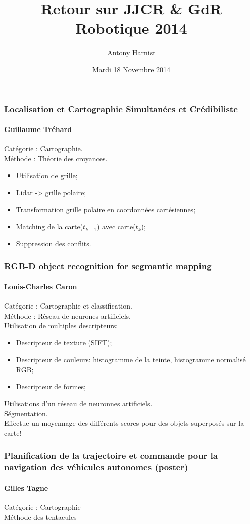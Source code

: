 \documentclass[xcolor=dvipsnames, 12, c, usepdftitle=false]{beamer}
\title[JJCR \& GDR Robotique '14]{Retour sur JJCR \& GdR Robotique 2014}
\author[A. Harnist]{Antony Harnist}
\institute[GIPSA-lab]{Grenoble Images Parole Signal Automatique}
\date[18/11/2014]{Mardi 18 Novembre 2014}
\begin{document}
\begin{frame}
\maketitle			%
\end{frame}

\begin{frame}[c, label=G. Trehard]
  \frametitle{Localisation et Cartographie Simultanées et Crédibiliste}
  \framesubtitle{Guillaume Tréhard}
  Catégorie : Cartographie. \\
  Méthode : Théorie des croyances.\\

  \begin{itemize}
    \item Utilisation de grille;
    \item Lidar -> grille polaire;
    \item Transformation grille polaire en coordonnées cartésiennes;
    \item Matching de la carte($t_{k-1}$) avec carte($t_{k}$);
    \item Suppression des conflits.
  \end{itemize}
\end{frame}
 
\begin{frame}[c, label=LC. Caron]
  \frametitle{RGB-D object recognition for segmantic mapping}
  \framesubtitle{Louis-Charles Caron}
  Catégorie : Cartographie et classification.\\
  Méthode : Réseau de neurones artificiels.\\
  Utilisation de multiples descripteurs:
      \begin{itemize}
	  \item Descripteur de texture (SIFT);
	  \item Descripteur de couleurs: histogramme de la teinte, histogramme normalisé RGB; 
	  \item Descripteur de formes;
      \end{itemize}
  Utilisations d'un réseau de neuronnes artificiels.\\
  Ségmentation.\\
  Effectue un moyennage des différents scores pour des objets superposés sur la carte!
\end{frame}


\begin{frame}[c, label=G. Tagne]
  \frametitle{Planification de la trajectoire et commande pour la navigation des véhicules autonomes (poster)}
  \framesubtitle{Gilles Tagne}
  Catégorie : Cartographie\\
  Méthode des tentacules
\end{frame}
\end{document}
